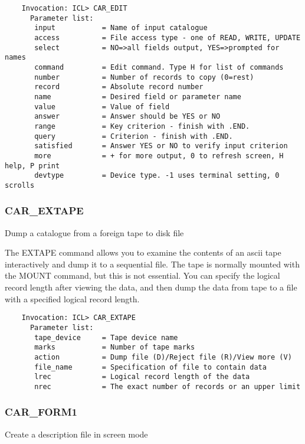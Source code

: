 \begin{verbatim} 
    Invocation: ICL> CAR_EDIT
      Parameter list:
       input           = Name of input catalogue
       access          = File access type - one of READ, WRITE, UPDATE
       select          = NO=>all fields output, YES=>prompted for names
       command         = Edit command. Type H for list of commands
       number          = Number of records to copy (0=rest)
       record          = Absolute record number 
       name            = Desired field or parameter name
       value           = Value of field
       answer          = Answer should be YES or NO
       range           = Key criterion - finish with .END.
       query           = Criterion - finish with .END.
       satisfied       = Answer YES or NO to verify input criterion
       more            = + for more output, 0 to refresh screen, H help, P print
       devtype         = Device type. -1 uses terminal setting, 0 scrolls
\end{verbatim}

\subsubsection{CAR\_EXTAPE}

Dump a catalogue from a foreign tape to disk file
 
 
The EXTAPE command allows you to examine the contents of an ascii tape 
interactively and dump it to a sequential file.
The tape is normally mounted with the MOUNT command, but this is not essential.
You can specify the logical record length after viewing the data, and then 
dump the data from tape to a file with a specified logical record length.
\begin{verbatim}
    Invocation: ICL> CAR_EXTAPE
      Parameter list:
       tape_device     = Tape device name
       marks           = Number of tape marks
       action          = Dump file (D)/Reject file (R)/View more (V)
       file_name       = Specification of file to contain data
       lrec            = Logical record length of the data
       nrec            = The exact number of records or an upper limit
\end{verbatim}

\subsubsection{CAR\_FORM1}

Create a description file in screen mode

